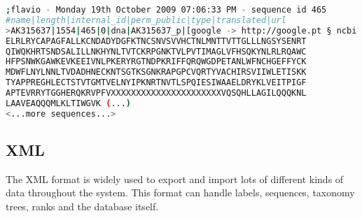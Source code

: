 \begin{itemize}
\begin{lstlisting}[float, language=bash,frame=single,breaklines=true,caption={Complex FASTA format example.}, label=ComplexFastaFormat]
;flavio - Monday 19th October 2009 07:06:33 PM - sequence id 465
#name|length|internal_id|perm_public|type|translated|url
>AK315637|1554|465|0|dna|AK315637_p|[google -> http://google.pt § ncbi -> http://www.ncbi.nlm.nih.gov/]
ELRLRYCAPAGFALLKCNDADYDGFKTNCSNVSVVHCTNLMNTTVTTGLLLNGSYSENRT
QIWQKHRTSNDSALILLNKHYNLTVTCKRPGNKTVLPVTIMAGLVFHSQKYNLRLRQAWC
HFPSNWKGAWKEVKEEIVNLPKERYRGTNDPKRIFFQRQWGDPETANLWFNCHGEFFYCK
MDWFLNYLNNLTVDADHNECKNTSGTKSGNKRAPGPCVQRTYVACHIRSVIIWLETISKK
TYAPPREGHLECTSTVTGMTVELNYIPKNRTNVTLSPQIESIWAAELDRYKLVEITPIGF
APTEVRRYTGGHERQKRVPFVXXXXXXXXXXXXXXXXXXXXXXVQSQHLLAGILQQQKNL
LAAVEAQQQMLKLTIWGVK (...)
<...more sequences...>
\end{lstlisting}
  
\end{itemize}

\subsection{XML}

The XML format is widely used to export and import lots of different kinds of data throughout the system. This format can handle labels, sequences, taxonomy trees, ranks and the database itself.

